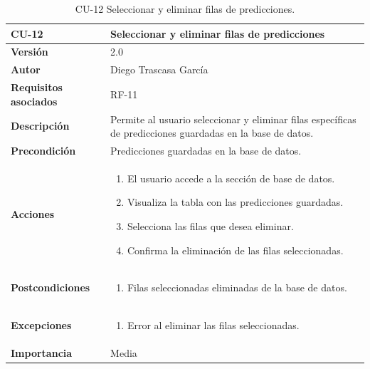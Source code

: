 \begin{table}[p]
	\centering
	\begin{tabularx}{\linewidth}{ p{} p{} }
		\toprule
		\textbf{CU-12}    & \textbf{Seleccionar y eliminar filas de predicciones}\\
		\toprule
		\textbf{Versión}              & 2.0    \\
		\textbf{Autor}                & Diego Trascasa García \\
		\textbf{Requisitos asociados} & RF-11 \\
		\textbf{Descripción}          & Permite al usuario seleccionar y eliminar filas específicas de predicciones guardadas en la base de datos. \\
		\textbf{Precondición}         & Predicciones guardadas en la base de datos. \\
		\textbf{Acciones}             &
		\begin{enumerate}
			\item El usuario accede a la sección de base de datos.
			\item Visualiza la tabla con las predicciones guardadas.
			\item Selecciona las filas que desea eliminar.
			\item Confirma la eliminación de las filas seleccionadas.
		\end{enumerate}\\
		\textbf{Postcondiciones}      & 
		\begin{enumerate}
			\item Filas seleccionadas eliminadas de la base de datos.
		\end{enumerate}\\
		\textbf{Excepciones}          & 
		\begin{enumerate}
			\item Error al eliminar las filas seleccionadas.
		\end{enumerate}\\
		\textbf{Importancia}          & Media \\
		\bottomrule
	\end{tabularx}
	\caption{CU-12 Seleccionar y eliminar filas de predicciones.}
    \label{CU-12}
\end{table}

